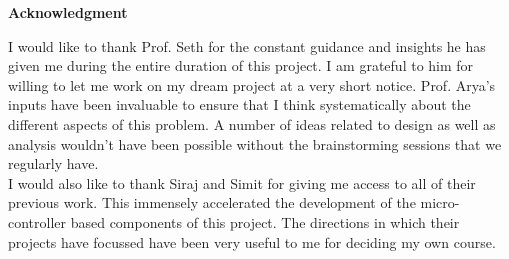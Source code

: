 \newpage
\vspace*{0.75in}
\label{pg:ack}
\begin{center} {\bf \Huge Acknowledgment}\\[0.5in] \end{center}
{\normalsize I would like to thank Prof. Seth for the constant guidance and insights he has given me during
the entire duration of this project. I am grateful to him for willing to let me work on my dream project at 
a very short notice. Prof. Arya's inputs have been invaluable to ensure
that I think systematically about the different aspects of this problem. A number of ideas related to 
design as well as analysis wouldn't have been possible without the brainstorming sessions that we regularly 
have.\\

I would also like to thank Siraj and Simit for giving me access to all of their previous work. This 
immensely accelerated the development of the micro-controller based components of this project. The 
directions in which their projects have focussed have been very useful to me for deciding my own course.\\}

